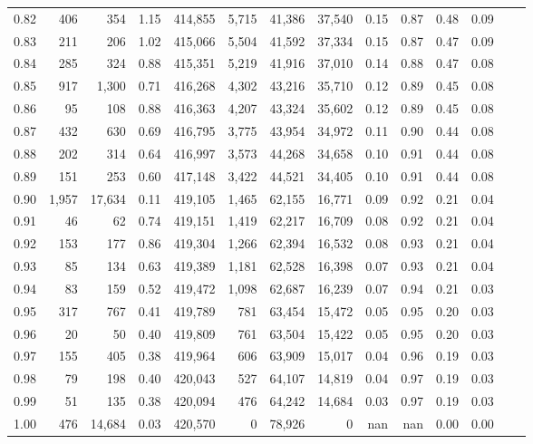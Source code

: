 \begin{tabular}{rrrrrrrrrrrrrr}
0.82 &     406 &     354 &      1.15 &  414,855 &    5,715 &  41,386 &  37,540 &  0.15 &  0.87 &  0.48 &      0.09 \\
0.83 &     211 &     206 &      1.02 &  415,066 &    5,504 &  41,592 &  37,334 &  0.15 &  0.87 &  0.47 &      0.09 \\
0.84 &     285 &     324 &      0.88 &  415,351 &    5,219 &  41,916 &  37,010 &  0.14 &  0.88 &  0.47 &      0.08 \\
0.85 &     917 &   1,300 &      0.71 &  416,268 &    4,302 &  43,216 &  35,710 &  0.12 &  0.89 &  0.45 &      0.08 \\
0.86 &      95 &     108 &      0.88 &  416,363 &    4,207 &  43,324 &  35,602 &  0.12 &  0.89 &  0.45 &      0.08 \\
0.87 &     432 &     630 &      0.69 &  416,795 &    3,775 &  43,954 &  34,972 &  0.11 &  0.90 &  0.44 &      0.08 \\
0.88 &     202 &     314 &      0.64 &  416,997 &    3,573 &  44,268 &  34,658 &  0.10 &  0.91 &  0.44 &      0.08 \\
0.89 &     151 &     253 &      0.60 &  417,148 &    3,422 &  44,521 &  34,405 &  0.10 &  0.91 &  0.44 &      0.08 \\
0.90 &   1,957 &  17,634 &      0.11 &  419,105 &    1,465 &  62,155 &  16,771 &  0.09 &  0.92 &  0.21 &      0.04 \\
0.91 &      46 &      62 &      0.74 &  419,151 &    1,419 &  62,217 &  16,709 &  0.08 &  0.92 &  0.21 &      0.04 \\
0.92 &     153 &     177 &      0.86 &  419,304 &    1,266 &  62,394 &  16,532 &  0.08 &  0.93 &  0.21 &      0.04 \\
0.93 &      85 &     134 &      0.63 &  419,389 &    1,181 &  62,528 &  16,398 &  0.07 &  0.93 &  0.21 &      0.04 \\
0.94 &      83 &     159 &      0.52 &  419,472 &    1,098 &  62,687 &  16,239 &  0.07 &  0.94 &  0.21 &      0.03 \\
0.95 &     317 &     767 &      0.41 &  419,789 &      781 &  63,454 &  15,472 &  0.05 &  0.95 &  0.20 &      0.03 \\
0.96 &      20 &      50 &      0.40 &  419,809 &      761 &  63,504 &  15,422 &  0.05 &  0.95 &  0.20 &      0.03 \\
0.97 &     155 &     405 &      0.38 &  419,964 &      606 &  63,909 &  15,017 &  0.04 &  0.96 &  0.19 &      0.03 \\
0.98 &      79 &     198 &      0.40 &  420,043 &      527 &  64,107 &  14,819 &  0.04 &  0.97 &  0.19 &      0.03 \\
0.99 &      51 &     135 &      0.38 &  420,094 &      476 &  64,242 &  14,684 &  0.03 &  0.97 &  0.19 &      0.03 \\
1.00 &     476 &  14,684 &      0.03 &  420,570 &        0 &  78,926 &       0 &   nan &   nan &  0.00 &      0.00 \\
\bottomrule
\end{tabular}
